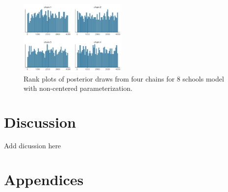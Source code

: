 \documentclass[american,]{article}
\providecommand{\tightlist}{%
  \setlength{\itemsep}{0pt}\setlength{\parskip}{0pt}}
\begin{document}
\begin{figure}[tp]
  \centering
  \includegraphics[width=0.47\textwidth]{graphics/hist-fit-ncp2-1.pdf}
  \caption{Rank plots of posterior draws from four chains for 8 schools model with non-centered parameterization.}
  \label{fig:hist-fit-ncp2-1}
\end{figure}



\hypertarget{discussion}{%
\section{Discussion}\label{discussion}}

Add dicussion here

\hypertarget{appendices}{%
\section*{Appendices}\label{appendices}}



\end{document}
